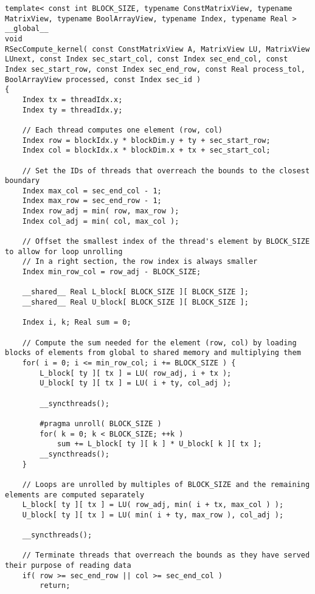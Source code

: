 \begin{lstlisting}[caption={The implementation of the \code{RSecCompute\_kernel()} kernel which computes one iteration of a right section.},label={Listing:ICMxPP-implementation->kernels->right-section-compute}]
template< const int BLOCK_SIZE, typename ConstMatrixView, typename MatrixView, typename BoolArrayView, typename Index, typename Real >
__global__
void
RSecCompute_kernel( const ConstMatrixView A, MatrixView LU, MatrixView LUnext, const Index sec_start_col, const Index sec_end_col, const Index sec_start_row, const Index sec_end_row, const Real process_tol, BoolArrayView processed, const Index sec_id )
{
	Index tx = threadIdx.x;
	Index ty = threadIdx.y;
	
	// Each thread computes one element (row, col)
	Index row = blockIdx.y * blockDim.y + ty + sec_start_row;
	Index col = blockIdx.x * blockDim.x + tx + sec_start_col;
	
	// Set the IDs of threads that overreach the bounds to the closest boundary
	Index max_col = sec_end_col - 1;
	Index max_row = sec_end_row - 1;
	Index row_adj = min( row, max_row );
	Index col_adj = min( col, max_col );
	
	// Offset the smallest index of the thread's element by BLOCK_SIZE to allow for loop unrolling
	// In a right section, the row index is always smaller
	Index min_row_col = row_adj - BLOCK_SIZE;
	
	__shared__ Real L_block[ BLOCK_SIZE ][ BLOCK_SIZE ];
	__shared__ Real U_block[ BLOCK_SIZE ][ BLOCK_SIZE ];
	
	Index i, k; Real sum = 0;
	
	// Compute the sum needed for the element (row, col) by loading blocks of elements from global to shared memory and multiplying them
	for( i = 0; i <= min_row_col; i += BLOCK_SIZE ) {
		L_block[ ty ][ tx ] = LU( row_adj, i + tx );
		U_block[ ty ][ tx ] = LU( i + ty, col_adj );
		
		__syncthreads();
		
		#pragma unroll( BLOCK_SIZE )
		for( k = 0; k < BLOCK_SIZE; ++k )
			sum += L_block[ ty ][ k ] * U_block[ k ][ tx ];
		__syncthreads();
	}
	
	// Loops are unrolled by multiples of BLOCK_SIZE and the remaining elements are computed separately
	L_block[ ty ][ tx ] = LU( row_adj, min( i + tx, max_col ) );
	U_block[ ty ][ tx ] = LU( min( i + ty, max_row ), col_adj );
	
	__syncthreads();
	
	// Terminate threads that overreach the bounds as they have served their purpose of reading data
	if( row >= sec_end_row || col >= sec_end_col )
		return;
	

\end{lstlisting}
